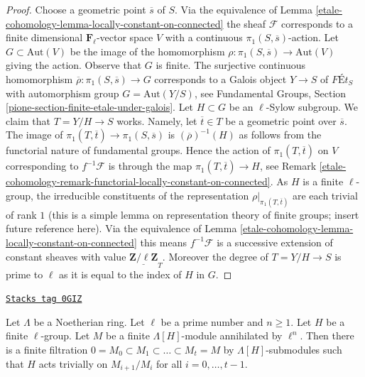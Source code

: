 \begin{proof}
Choose a geometric point $\overline{s}$ of $S$.
Via the equivalence of Lemma \ref{etale-cohomology-lemma-locally-constant-on-connected}
the sheaf $\mathcal{F}$ corresponds to a finite dimensional
$\mathbf{F}_\ell$-vector space $V$ with a continuous
$\pi_1(S, \overline{s})$-action.
Let $G \subset \text{Aut}(V)$ be the image of the homomorphism
$\rho : \pi_1(S, \overline{s}) \to \text{Aut}(V)$ giving the action.
Observe that $G$ is finite.
The surjective continuous homomorphism
$\overline{\rho} : \pi_1(S, \overline{s}) \to G$
corresponds to a Galois object $Y \to S$ of
$\textit{F\'Et}_S$ with automorphism group $G = \text{Aut}(Y/S)$, see
Fundamental Groups, Section \ref{pione-section-finite-etale-under-galois}.
Let $H \subset G$ be an $\ell$-Sylow subgroup.
We claim that $T = Y/H \to S$ works. Namely, let $\overline{t} \in T$
be a geometric point over $\overline{s}$. The image of
$\pi_1(T, \overline{t}) \to \pi_1(S, \overline{s})$
is $(\overline{\rho})^{-1}(H)$ as follows from the functorial
nature of fundamental groups. Hence the action of $\pi_1(T, \overline{t})$
on $V$ corresponding to $f^{-1}\mathcal{F}$ is through
the map $\pi_1(T, \overline{t}) \to H$, see
Remark \ref{etale-cohomology-remark-functorial-locally-constant-on-connected}. As
$H$ is a finite $\ell$-group, the irreducible constituents of the
representation $\rho|_{\pi_1(T, \overline{t})}$
are each trivial of rank $1$ (this is a simple lemma on
representation theory of finite groups; insert future reference here).
Via the equivalence of
Lemma \ref{etale-cohomology-lemma-locally-constant-on-connected}
this means $f^{-1}\mathcal{F}$ is a successive extension of
constant sheaves with value $\underline{\mathbf{Z}/\ell\mathbf{Z}}_T$.
Moreover the degree of $T = Y/H \to S$ is prime to $\ell$
as it is equal to the index of $H$ in $G$.
\end{proof}

\begin{lemma}
\label{etale-cohomology-lemma-action-l-group}
\href{https://stacks.math.columbia.edu/tag/0GIZ}{\texttt{Stacks tag 0GIZ}}

Let $\Lambda$ be a Noetherian ring.
Let $\ell$ be a prime number and $n \geq 1$.
Let $H$ be a finite $\ell$-group.
Let $M$ be a finite $\Lambda[H]$-module annihilated by $\ell^n$.
Then there is a finite filtration
$0 = M_0 \subset M_1 \subset \ldots \subset M_t = M$
by $\Lambda[H]$-submodules
such that $H$ acts trivially on $M_{i + 1}/M_i$ for all
$i = 0, \ldots, t - 1$.
\end{lemma}

